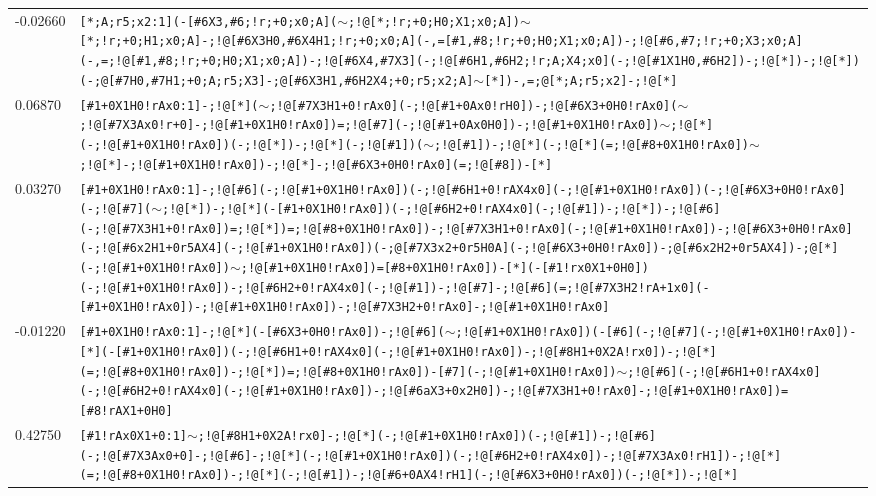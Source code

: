 \begin{longtable}{>{\baselineskip=10pt}p{} >{\baselineskip=10pt}p{}}
-0.02660 & \texttt{[*;A;r5;x2:1](-[\#6X3,\#6;!r;+0;x0;A]($\sim$;!@[*;!r;+0;H0;X1;x0;A])$\sim$[*;!r;+0;H1;x0;A]-;!@[\#6X3H0,\#6X4H1;!r;+0;x0;A](-,=[\#1,\#8;!r;+0;H0;X1;x0;A])-;!@[\#6,\#7;!r;+0;X3;x0;A](-,=;!@[\#1,\#8;!r;+0;H0;X1;x0;A])-;!@[\#6X4,\#7X3](-;!@[\#6H1,\#6H2;!r;A;X4;x0](-;!@[\#1X1H0,\#6H2])-;!@[*])-;!@[*])(-;@[\#7H0,\#7H1;+0;A;r5;X3]-;@[\#6X3H1,\#6H2X4;+0;r5;x2;A]$\sim$[*])-,=;@[*;A;r5;x2]-;!@[*]} \\ 
0.06870 & \texttt{[\#1+0X1H0!rAx0:1]-;!@[*]($\sim$;!@[\#7X3H1+0!rAx0](-;!@[\#1+0Ax0!rH0])-;!@[\#6X3+0H0!rAx0]($\sim$;!@[\#7X3Ax0!r+0]-;!@[\#1+0X1H0!rAx0])=;!@[\#7](-;!@[\#1+0Ax0H0])-;!@[\#1+0X1H0!rAx0])$\sim$;!@[*](-;!@[\#1+0X1H0!rAx0])(-;!@[*])-;!@[*](-;!@[\#1])($\sim$;!@[\#1])-;!@[*](-;!@[*](=;!@[\#8+0X1H0!rAx0])$\sim$;!@[*]-;!@[\#1+0X1H0!rAx0])-;!@[*]-;!@[\#6X3+0H0!rAx0](=;!@[\#8])-[*]} \\ 
0.03270 & \texttt{[\#1+0X1H0!rAx0:1]-;!@[\#6](-;!@[\#1+0X1H0!rAx0])(-;!@[\#6H1+0!rAX4x0](-;!@[\#1+0X1H0!rAx0])(-;!@[\#6X3+0H0!rAx0](-;!@[\#7]($\sim$;!@[*])-;!@[*](-[\#1+0X1H0!rAx0])(-;!@[\#6H2+0!rAX4x0](-;!@[\#1])-;!@[*])-;!@[\#6](-;!@[\#7X3H1+0!rAx0])=;!@[*])=;!@[\#8+0X1H0!rAx0])-;!@[\#7X3H1+0!rAx0](-;!@[\#1+0X1H0!rAx0])-;!@[\#6X3+0H0!rAx0](-;!@[\#6x2H1+0r5AX4](-;!@[\#1+0X1H0!rAx0])(-;@[\#7X3x2+0r5H0A](-;!@[\#6X3+0H0!rAx0])-;@[\#6x2H2+0r5AX4])-;@[*](-;!@[\#1+0X1H0!rAx0])$\sim$;!@[\#1+0X1H0!rAx0])=[\#8+0X1H0!rAx0])-[*](-[\#1!rx0X1+0H0])(-;!@[\#1+0X1H0!rAx0])-;!@[\#6H2+0!rAX4x0](-;!@[\#1])-;!@[\#7]-;!@[\#6](=;!@[\#7X3H2!rA+1x0](-[\#1+0X1H0!rAx0])-;!@[\#1+0X1H0!rAx0])-;!@[\#7X3H2+0!rAx0]-;!@[\#1+0X1H0!rAx0]} \\ 
-0.01220 & \texttt{[\#1+0X1H0!rAx0:1]-;!@[*](-[\#6X3+0H0!rAx0])-;!@[\#6]($\sim$;!@[\#1+0X1H0!rAx0])(-[\#6](-;!@[\#7](-;!@[\#1+0X1H0!rAx0])-[*](-[\#1+0X1H0!rAx0])(-;!@[\#6H1+0!rAX4x0](-;!@[\#1+0X1H0!rAx0])-;!@[\#8H1+0X2A!rx0])-;!@[*](=;!@[\#8+0X1H0!rAx0])-;!@[*])=;!@[\#8+0X1H0!rAx0])-[\#7](-;!@[\#1+0X1H0!rAx0])$\sim$;!@[\#6](-;!@[\#6H1+0!rAX4x0](-;!@[\#6H2+0!rAX4x0](-;!@[\#1+0X1H0!rAx0])-;!@[\#6aX3+0x2H0])-;!@[\#7X3H1+0!rAx0]-;!@[\#1+0X1H0!rAx0])=[\#8!rAX1+0H0]} \\ 
0.42750 & \texttt{[\#1!rAx0X1+0:1]$\sim$;!@[\#8H1+0X2A!rx0]-;!@[*](-;!@[\#1+0X1H0!rAx0])(-;!@[\#1])-;!@[\#6](-;!@[\#7X3Ax0+0]-;!@[\#6]-;!@[*](-;!@[\#1+0X1H0!rAx0])(-;!@[\#6H2+0!rAX4x0])-;!@[\#7X3Ax0!rH1])-;!@[*](=;!@[\#8+0X1H0!rAx0])-;!@[*](-;!@[\#1])-;!@[\#6+0AX4!rH1](-;!@[\#6X3+0H0!rAx0])(-;!@[*])-;!@[*]} \\ 

\end{longtable}
